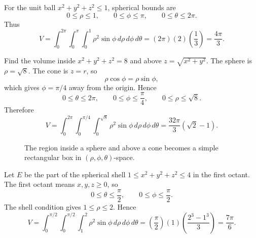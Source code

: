 \documentclass[11pt,oneside]{book}
\begin{document}
\begin{examplebox}
For the unit ball $x^2+y^2+z^2\le 1$, spherical bounds are
\[
0\le \rho\le 1,\qquad 0\le \phi\le \pi,\qquad 0\le \theta\le 2\pi.
\]
Thus
\[
V=\int_0^{2\pi}\int_0^\pi\int_0^1 \rho^2\sin\phi\,d\rho\,d\phi\,d\theta
=(2\pi)(2)\left(\frac13\right)=\frac{4\pi}{3}.
\]
\end{examplebox}

\begin{examplebox}
Find the volume inside $x^2+y^2+z^2=8$ and above $z=\sqrt{x^2+y^2}$. The sphere is $\rho=\sqrt8$. The cone is $z=r$, so
\[
\rho\cos\phi=\rho\sin\phi,
\]
which gives $\phi=\pi/4$ away from the origin. Hence
\[
0\le \theta\le 2\pi,
\qquad 0\le \phi\le \frac{\pi}{4},
\qquad 0\le \rho\le \sqrt8.
\]
Therefore
\[
V=\int_0^{2\pi}\int_0^{\pi/4}\int_0^{\sqrt8}\rho^2\sin\phi\,d\rho\,d\phi\,d\theta
=\frac{32\pi}{3}(\sqrt2-1).
\]
\end{examplebox}

\begin{figure}[H]
\centering
{}
\caption{The region inside a sphere and above a cone becomes a simple rectangular box in $(\rho,\phi,\theta)$-space.}
\end{figure}

\begin{examplebox}
Let $E$ be the part of the spherical shell $1\le x^2+y^2+z^2\le 4$ in the first octant. The first octant means $x,y,z\ge 0$, so
\[
0\le \theta\le \frac{\pi}{2},\qquad 0\le \phi\le \frac{\pi}{2}.
\]
The shell condition gives $1\le \rho\le 2$. Hence
\[
V=\int_0^{\pi/2}\int_0^{\pi/2}\int_1^2 \rho^2\sin\phi\,d\rho\,d\phi\,d\theta
=\left(\frac{\pi}{2}\right)(1)\left(\frac{2^3-1^3}{3}\right)=\frac{7\pi}{6}.
\]
\end{examplebox}
\end{document}
